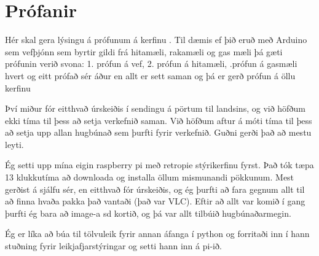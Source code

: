 \section{Prófanir}
Hér skal gera lýsingu á prófunum á kerfinu . Til dæmis ef þið eruð með Arduino sem vefþjónn sem byrtir gildi frá hitamæli, rakamæli og gas mæli þá gæti prófunin verið svona: 1. prófun á vef, 2. prófun á hitamæli, .prófun á gasmæli hvert og eitt prófað sér áður en allt er sett saman og þá er gerð prófun á öllu kerfinu

Því miður fór eitthvað úrskeiðis í sendingu á pörtum til landsins, og við höfðum ekki tíma til þess að setja verkefnið saman. Við höfðum aftur á móti tíma til þess að setja upp allan hugbúnað sem þurfti fyrir verkefnið. Guðni gerði það að mestu leyti.

Ég setti upp mína eigin raspberry pi með retropie stýrikerfinu fyrst. Það tók tæpa 13 klukkutíma að downloada og installa öllum mismunandi pökkunum. Mest gerðist á sjálfu sér, en eitthvað fór úrskeiðis, og ég þurfti að fara gegnum allt til að finna hvaða pakka það vantaði (það var VLC). Eftir að allt var komið í gang þurfti ég bara að image-a sd kortið, og þá var allt tilbúið hugbúnaðarmegin.

Ég er líka að búa til tölvuleik fyrir annan áfanga í python og forritaði inn í hann stuðning fyrir leikjafjarstýringar og setti hann inn á pi-ið.